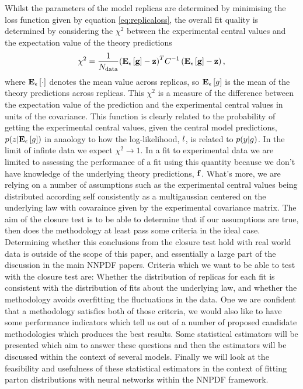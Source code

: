 Whilst the parameters of the model replicas are determined by minimising
the loss function given by equation \eqref{eq:replicaloss}, the overall fit
quality is determined by considering the $\chi^2$ between the experimental
central values and the expectation value of the theory predictions
\begin{equation}\label{eq:centralchi2}
    \chi^2 = \frac{1}{N_{\rm data}} {\left( \mathbf{E}_{\epsilon}\left[ \mathbf{g} \right] - \mathbf{z} \right)}^{T} C^{-1}_{} \left( \mathbf{E}_{\epsilon}\left[ \mathbf{g} \right] - \mathbf{z} \right),
\end{equation}
where $\mathbf{E}_{\epsilon}\left[ \cdot \right]$ denotes the mean value across replicas, so $\mathbf{E}_{\epsilon}\left[ g \right]$ is
the mean of the theory predictions across replicas. This $\chi^2$ is a measure
of the difference between the expectation value of the prediction and the
experimental central values in units of the covariance. This function is clearly
related to the probability of getting the experimental central values, given
the central model predictions, $p(z \vert \mathbf{E}_{\epsilon}\left[ g \right])$ in anaology to
how the log-likelihood, $l$, is related to $p(y \vert g)$. In
the limit of infinte data we expect $\chi^2 \rightarrow 1$. In a fit to
experimental data we are limited to assessing the performance of a fit
using this quantity because we don't have knowledge of the underlying
theory predictions, $\mathbf{f}$. What's more, we are relying on a number of 
assumptions such as the experimental central values being distributed
according self consistently as a multigaussian centered on the underlying law
with covaraince given by the experimental covariance matrix. The aim of the
closure test is to be able to determine that if our assumptions are true, then
does the methodology at least pass some criteria in the ideal case. Determining
whether this conclusions from the closure test hold with real world data is
outside of the scope of this paper, and essentially a large part of the discussion
in the main NNPDF papers. Criteria which we want to be able to test with the closure
test are: Whether the distribution of replicas for each fit is
consistent with the distribution of fits about the underlying law, and
whether the methodology avoids overfitting the fluctuations in the data. One we are
confident that a methodology satisfies both of those criteria, we would also
like to have some performance indicators which tell us out of a number of proposed
candidate methodologies which produces the best results. Some statistical
estimators will be presented which aim to answer these questions and then the
estimators will be discussed within the context of several models. Finally we
will look at the feasibility and usefulness of these statistical estimators in
the context of fitting parton distributions with neural networks within the
NNPDF framework.
